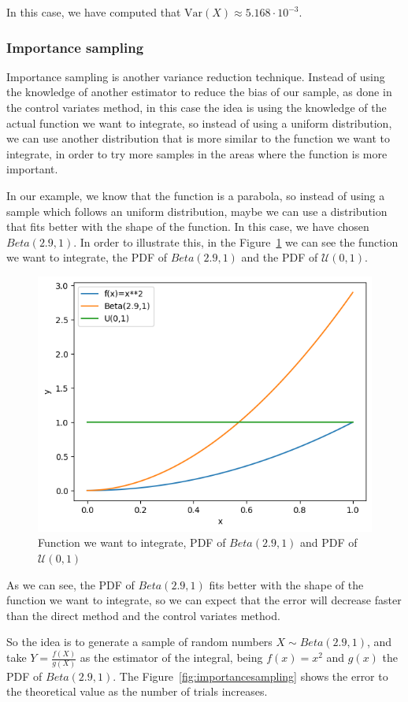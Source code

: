 \documentclass{article}
\begin{document}
In this case, we have computed that \(\mathrm{Var}(X) \approx 5.168 \cdot 10^{-3}\).

\subsubsection{Importance sampling}
\label{sec:importance_sampling}

Importance sampling is another variance reduction technique. Instead of using the knowledge of another estimator to reduce the bias of our sample, as done in the control variates method, in this case the idea is using the knowledge of the actual function we want to integrate, so instead of using a uniform distribution, we can use another distribution that is more similar to the function we want to integrate, in order to try more samples in the areas where the function is more important. 

In our example, we know that the function is a parabola, so instead of using a sample which follows an uniform distribution, maybe we can use a distribution that fits better with the shape of the function. In this case, we have chosen \(Beta(2.9,1)\). In order to illustrate this, in the Figure~\ref{fig:beta42_f} we can see the function we want to integrate, the PDF of \(Beta(2.9,1)\) and the PDF of \(\mathcal{U}(0,1)\).

\begin{figure}[H]
	\centering
	\includegraphics[width=0.5\linewidth]{./Figures/VarianceReduction/beta.png}
	\caption{Function we want to integrate, PDF of \(Beta(2.9,1)\) and PDF of \(\mathcal{U}(0,1)\)}
	\label{fig:beta42_f}
\end{figure}

As we can see, the PDF of \(Beta(2.9,1)\) fits better with the shape of the function we want to integrate, so we can expect that the error will decrease faster than the direct method and the control variates method. 

So the idea is to generate a sample of random numbers \(X \sim Beta(2.9,1)\), and take \(Y = \frac{f(X)}{g(X)}\) as the estimator of the integral, being \(f(x) = x^2\) and \(g(x)\) the PDF of \(Beta(2.9,1)\). The Figure~\ref{fig:importancesampling} shows the error to the theoretical value as the number of trials increases.
\end{document}

